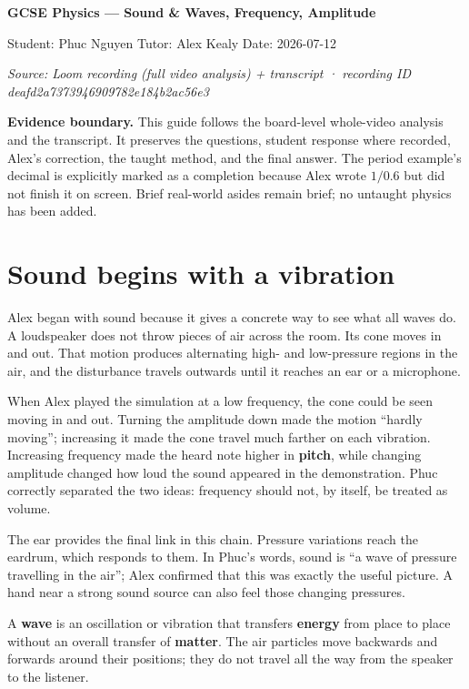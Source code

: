 \documentclass[11pt,a4paper]{article}
\newcommand{\key}[1]{\begin{keybox}#1\end{keybox}}
\begin{document}
\begin{center}
{\Huge\bfseries\color{navy} GCSE Physics — Sound \& Waves, Frequency, Amplitude}\par\vspace{5pt}
{\large Student: Phuc Nguyen \quad Tutor: Alex Kealy \quad Date: 2026-07-12}\par\vspace{4pt}
\textit{Source: Loom recording (full video analysis) + transcript · recording ID deafd2a7373946909782e184b2ac56e3}
\end{center}
\key{\textbf{Evidence boundary.} This guide follows the board-level whole-video analysis and the transcript. It preserves the questions, student response where recorded, Alex's correction, the taught method, and the final answer. The period example's decimal is explicitly marked as a completion because Alex wrote $1/0.6$ but did not finish it on screen. Brief real-world asides remain brief; no untaught physics has been added.}

\tableofcontents

\section{Sound begins with a vibration}
Alex began with sound because it gives a concrete way to see what all waves do. A loudspeaker does not throw pieces of air across the room. Its cone moves in and out. That motion produces alternating high- and low-pressure regions in the air, and the disturbance travels outwards until it reaches an ear or a microphone.

When Alex played the simulation at a low frequency, the cone could be seen moving in and out. Turning the amplitude down made the motion ``hardly moving''; increasing it made the cone travel much farther on each vibration. Increasing frequency made the heard note higher in \textbf{pitch}, while changing amplitude changed how loud the sound appeared in the demonstration. Phuc correctly separated the two ideas: frequency should not, by itself, be treated as volume.

The ear provides the final link in this chain. Pressure variations reach the eardrum, which responds to them. In Phuc's words, sound is ``a wave of pressure travelling in the air''; Alex confirmed that this was exactly the useful picture. A hand near a strong sound source can also feel those changing pressures.

\begin{keybox}[title=\textbf{The definition Alex built from the speaker}]
A \textbf{wave} is an oscillation or vibration that transfers \textbf{energy} from place to place without an overall transfer of \textbf{matter}. The air particles move backwards and forwards around their positions; they do not travel all the way from the speaker to the listener.
\end{keybox}
\end{document}
